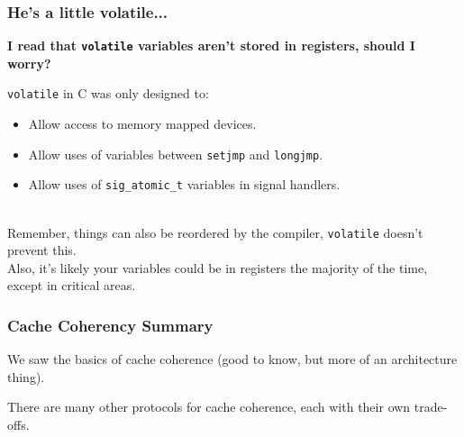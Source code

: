 \begin{frame}[fragile]
  \frametitle{He's a little volatile...}

  
  {\bf I read that {\tt volatile} variables aren't stored in registers,
     should I worry?}

    {\tt volatile} in C was only designed to:
      \begin{itemize}
        \item Allow access to memory mapped devices.
        \item Allow uses of variables between {\tt setjmp} and {\tt longjmp}.
        \item Allow uses of {\tt sig\_atomic\_t} variables in signal handlers.
      \end{itemize}~\\[1em]
    Remember, things can also be reordered by the compiler,
      {\tt volatile} doesn't prevent this.\\[1em]
    Also, it's likely your variables could be in registers the majority
      of the time, except in critical areas.
  
\end{frame}

\begin{frame}
  \frametitle{Cache Coherency Summary}

  
We saw the basics of cache coherence (good to know, but more of an architecture
      thing).
      
There are many other protocols for cache coherence, each with their own
      trade-offs.\\[1em]


  
\end{frame}



